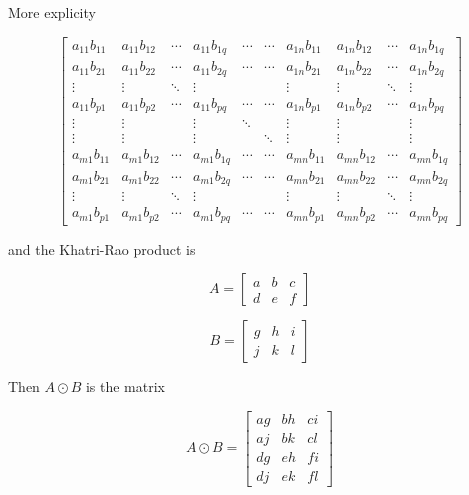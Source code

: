 More explicity

\[
    \begin{bmatrix}
   a_{11} b_{11} & a_{11} b_{12} & \cdots & a_{11} b_{1q} &
                   \cdots & \cdots & a_{1n} b_{11} & a_{1n} b_{12} & \cdots & a_{1n} b_{1q} \\
   a_{11} b_{21} & a_{11} b_{22} & \cdots & a_{11} b_{2q} &
                   \cdots & \cdots & a_{1n} b_{21} & a_{1n} b_{22} & \cdots & a_{1n} b_{2q} \\
   \vdots & \vdots & \ddots & \vdots & & & \vdots & \vdots & \ddots & \vdots \\
   a_{11} b_{p1} & a_{11} b_{p2} & \cdots & a_{11} b_{pq} &
                   \cdots & \cdots & a_{1n} b_{p1} & a_{1n} b_{p2} & \cdots & a_{1n} b_{pq} \\
   \vdots & \vdots & & \vdots & \ddots & & \vdots & \vdots & & \vdots \\
   \vdots & \vdots & & \vdots & & \ddots & \vdots & \vdots & & \vdots \\
   a_{m1} b_{11} & a_{m1} b_{12} & \cdots & a_{m1} b_{1q} &
                   \cdots & \cdots & a_{mn} b_{11} & a_{mn} b_{12} & \cdots & a_{mn} b_{1q} \\
   a_{m1} b_{21} & a_{m1} b_{22} & \cdots & a_{m1} b_{2q} &
                   \cdots & \cdots & a_{mn} b_{21} & a_{mn} b_{22} & \cdots & a_{mn} b_{2q} \\
   \vdots & \vdots & \ddots & \vdots & & & \vdots & \vdots & \ddots & \vdots \\
   a_{m1} b_{p1} & a_{m1} b_{p2} & \cdots & a_{m1} b_{pq} &
                   \cdots & \cdots & a_{mn} b_{p1} & a_{mn} b_{p2} & \cdots & a_{mn} b_{pq}
    \end{bmatrix}
\]


and the Khatri-Rao product is

\[
    A = 
    \begin{bmatrix}
      a & b & c \\
      d & e & f
    \end{bmatrix}
\]

\[
    B =
    \begin{bmatrix}
      g & h & i \\
      j & k & l
    \end{bmatrix}
\]


Then $A \odot B$ is the matrix

\[
    A \odot B = 
    \begin{bmatrix}
      ag & bh & ci \\
      aj & bk & cl \\
      dg & eh & fi \\
      dj & ek & fl
    \end{bmatrix}
\]

